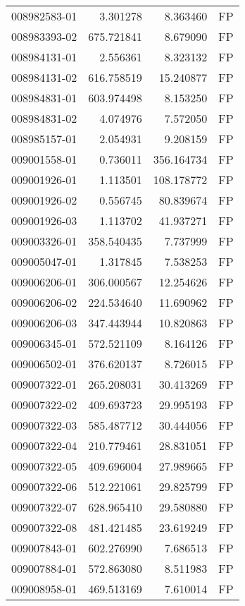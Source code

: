 \begin{tabular}{lrrl}
008982583-01 &    3.301278 &     8.363460 &   FP \\
008983393-02 &  675.721841 &     8.679090 &   FP \\
008984131-01 &    2.556361 &     8.323132 &   FP \\
008984131-02 &  616.758519 &    15.240877 &   FP \\
008984831-01 &  603.974498 &     8.153250 &   FP \\
008984831-02 &    4.074976 &     7.572050 &   FP \\
008985157-01 &    2.054931 &     9.208159 &   FP \\
009001558-01 &    0.736011 &   356.164734 &   FP \\
009001926-01 &    1.113501 &   108.178772 &   FP \\
009001926-02 &    0.556745 &    80.839674 &   FP \\
009001926-03 &    1.113702 &    41.937271 &   FP \\
009003326-01 &  358.540435 &     7.737999 &   FP \\
009005047-01 &    1.317845 &     7.538253 &   FP \\
009006206-01 &  306.000567 &    12.254626 &   FP \\
009006206-02 &  224.534640 &    11.690962 &   FP \\
009006206-03 &  347.443944 &    10.820863 &   FP \\
009006345-01 &  572.521109 &     8.164126 &   FP \\
009006502-01 &  376.620137 &     8.726015 &   FP \\
009007322-01 &  265.208031 &    30.413269 &   FP \\
009007322-02 &  409.693723 &    29.995193 &   FP \\
009007322-03 &  585.487712 &    30.444056 &   FP \\
009007322-04 &  210.779461 &    28.831051 &   FP \\
009007322-05 &  409.696004 &    27.989665 &   FP \\
009007322-06 &  512.221061 &    29.825799 &   FP \\
009007322-07 &  628.965410 &    29.580880 &   FP \\
009007322-08 &  481.421485 &    23.619249 &   FP \\
009007843-01 &  602.276990 &     7.686513 &   FP \\
009007884-01 &  572.863080 &     8.511983 &   FP \\
009008958-01 &  469.513169 &     7.610014 &   FP \\

\end{tabular}

